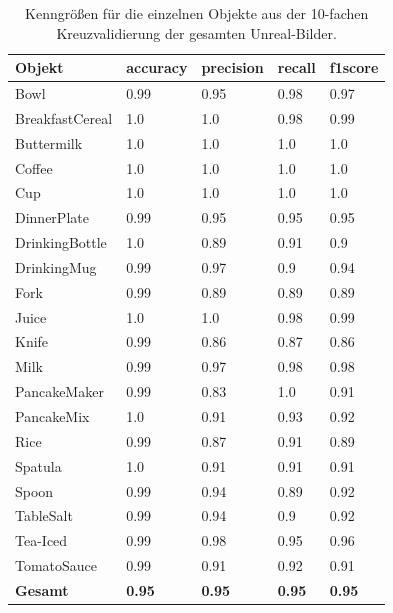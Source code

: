 \begin{table}
\begin{tabularx}{\textwidth}{Xllll}
\textbf{Objekt}	& \textbf{\gls{accuracy}} & \textbf{\gls{precision}}	& \textbf{\gls{recall}}	& \textbf{\gls{f1score}} \\ \hline
Bowl & 0.99 & 0.95 & 0.98 & 0.97 \\  
BreakfastCereal & 1.0 & 1.0 & 0.98 & 0.99 \\  
Buttermilk & 1.0 & 1.0 & 1.0 & 1.0 \\  
Coffee & 1.0 & 1.0 & 1.0 & 1.0 \\  
Cup & 1.0 & 1.0 & 1.0 & 1.0 \\  
DinnerPlate & 0.99 & 0.95 & 0.95 & 0.95 \\  
DrinkingBottle & 1.0 & 0.89 & 0.91 & 0.9 \\  
DrinkingMug & 0.99 & 0.97 & 0.9 & 0.94 \\  
Fork & 0.99 & 0.89 & 0.89 & 0.89 \\  
Juice & 1.0 & 1.0 & 0.98 & 0.99 \\  
Knife & 0.99 & 0.86 & 0.87 & 0.86 \\  
Milk & 0.99 & 0.97 & 0.98 & 0.98 \\  
PancakeMaker & 0.99 & 0.83 & 1.0 & 0.91 \\  
PancakeMix & 1.0 & 0.91 & 0.93 & 0.92 \\  
Rice & 0.99 & 0.87 & 0.91 & 0.89 \\  
Spatula & 1.0 & 0.91 & 0.91 & 0.91 \\  
Spoon & 0.99 & 0.94 & 0.89 & 0.92 \\  
TableSalt & 0.99 & 0.94 & 0.9 & 0.92 \\  
Tea-Iced & 0.99 & 0.98 & 0.95 & 0.96 \\  
TomatoSauce & 0.99 & 0.91 & 0.92 & 0.91 \\  \hline
\textbf{Gesamt}		&	\textbf{0.95}   &	\textbf{0.95}  & \textbf{0.95}     &  \textbf{0.95}     \\
\end{tabularx}
\caption[Objekt-spezifische Kenngrößen des gesamten Unreal-Bilder Datensatzes]{Kenngrößen für die einzelnen Objekte aus der 10-fachen Kreuzvalidierung der gesamten Unreal-Bilder.}
\label{tab:UnrealGTClass_metrics}
\end{table}


